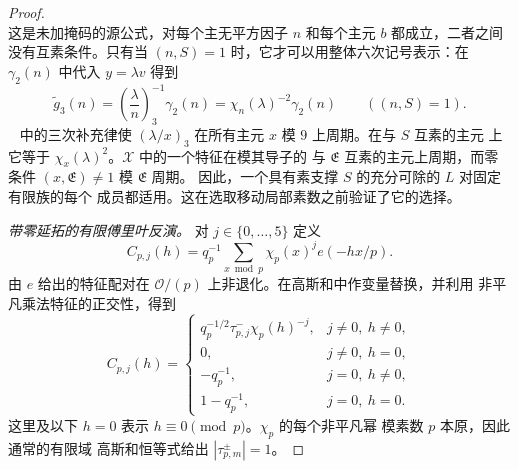 \documentclass[11pt,a4paper]{article}
\numberwithin{equation}{section}
\numberwithin{figure}{section}
\theoremstyle{definition}
\theoremstyle{remark}
\begin{document}
\begin{proof}
\begin{equation}
\end{equation}
这是未加掩码的源公式，对每个主无平方因子 $n$
和每个主元 $b$ 都成立，二者之间没有互素条件。只有当
$(n,S)=1$ 时，它才可以用整体六次记号表示：在 $\gamma_2(n)$ 中代入
$y=\lambda v$ 得到
\begin{equation}\label{eq:reflection-cubic-sextic-conversion}
 \widetilde g_3(n)=\left(\frac\lambda n\right)_3^{-1}\gamma_2(n)
       =\chi_n(\lambda)^{-2}\gamma_2(n)\qquad((n,S)=1).
\end{equation}
~\cite[Equation (1.5)]{DR} 中的三次补充律使
$(\lambda/x)_3$ 在所有主元 $x$ 模 $9$ 上周期。在与 $S$ 互素的主元
上它等于 $\chi_x(\lambda)^2$。$\mathcal X$ 中的一个特征在模其导子的
与 $\mathfrak E$ 互素的主元上周期，而零条件 $(x,\mathfrak E)\ne1$
模 $\mathfrak E$ 周期。
因此，一个具有素支撑 $S$ 的充分可除的 $L$ 对固定有限族的每个
成员都适用。这在选取移动局部素数之前验证了它的选择。

\emph{带零延拓的有限傅里叶反演。}
对 $j\in\{0,\ldots,5\}$ 定义
\[
 C_{p,j}(h)=q_p^{-1}\sum_{x\bmod p}\chi_p(x)^j e(-hx/p).
\]
由 $e$ 给出的特征配对在
$\mathcal O/(p)$ 上非退化。在高斯和中作变量替换，并利用
非平凡乘法特征的正交性，得到
\begin{equation}\label{eq:reflection-local-fourier}
 C_{p,j}(h)=\begin{cases}
 q_p^{-1/2}\tau_{p,j}^{-}\chi_p(h)^{-j},&j\ne0,\ h\ne0,\\
 0,&j\ne0,\ h=0,\\
 -q_p^{-1},&j=0,\ h\ne0,\\
 1-q_p^{-1},&j=0,\ h=0.
 \end{cases}
\end{equation}
这里及以下 $h=0$ 表示 $h\equiv0\pmod p$。$\chi_p$ 的每个非平凡幂
模素数 $p$ 本原，因此通常的有限域
高斯和恒等式给出 $|\tau_{p,m}^{\pm}|=1$。


\end{proof}
\end{document}
